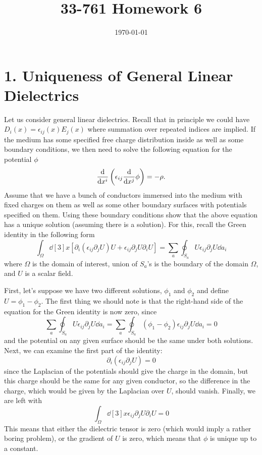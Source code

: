 \documentclass[a4paper,twoside]{article}
\title{33-761 Homework 6}
\date{\today}
\begin{document}
\maketitle


\section*{1. Uniqueness of General Linear Dielectrics}
Let us consider general linear dielectrics. Recall that in principle we could have $ D_i(x) = \epsilon_{ij} (x) E_j(x) $ where summation over repeated indices are implied. If the medium has some specified free charge distribution inside as well as some boundary conditions, we then need to solve the following equation for the potential $ \phi $
\begin{equation}
    \dv{x^i}\left( \epsilon_{ij} \dv{x^j}\phi \right)= -\rho.
\end{equation}
Assume that we have a bunch of conductors immersed into the medium with fixed charges on them as well as some other boundary surfaces with potentials specified on them. Using these boundary conditions show that the above equation has a unique solution (assuming there is a solution). For this, recall the Green identity in the following form
\begin{equation}
    \int_{\Omega} \dd[3]{x} \left[ \partial_i(\epsilon_{ij}\partial_j U)U + \epsilon_{ij}\partial_j U\partial_i U \right] = \sum_{a} \oint_{S_a} U \epsilon_{ij} \partial_j U \dd{a_i}
\end{equation}
where $\Omega$ is the domain of interest, union of $ S_a $’s is the boundary of the domain $ \Omega $, and $ U $ is a scalar field.
\begin{tcolorbox}[breakable]
    First, let's suppose we have two different solutions, $ \phi_1 $ and $ \phi_2 $ and define $ U = \phi_1 - \phi_2 $. The first thing we should note is that the right-hand side of the equation for the Green identity is now zero, since
    \begin{equation}
        \sum_{a} \oint_{S_a} U \epsilon_{ij} \partial_j U \dd{a_i} = \sum_{a} \oint_{S_a} (\phi_1 - \phi_2) \epsilon_{ij} \partial_j U \dd{a_i} = 0
    \end{equation}
    and the potential on any given surface should be the same under both solutions. Next, we can examine the first part of the identity:
    \begin{equation}
        \partial_i(\epsilon_{ij}\partial_j U) = 0
    \end{equation}
    since the Laplacian of the potentials should give the charge in the domain, but this charge should be the same for any given conductor, so the difference in the charge, which would be given by the Laplacian over $ U $, should vanish. Finally, we are left with
    \begin{equation}
        \int_{\Omega} \dd[3]{x} \epsilon_{ij} \partial_j U \partial_i U = 0
    \end{equation}
    This means that either the dielectric tensor is zero (which would imply a rather boring problem), or the gradient of $ U $ is zero, which means that $ \phi $ is unique up to a constant.
\end{tcolorbox}
\end{document}
